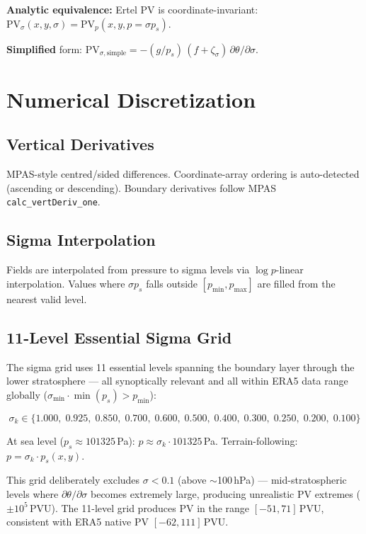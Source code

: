 \documentclass[11pt,a4paper]{article}
\begin{document}
\textbf{Analytic equivalence:} Ertel PV is coordinate-invariant:
$\mathrm{PV}_\sigma(x,y,\sigma) = \mathrm{PV}_p(x,y,p=\sigma p_s)$.

\textbf{Simplified} form: $\mathrm{PV}_{\sigma,\mathrm{simple}} =
  -(g/p_s)\,(f + \zeta_\sigma)\,\partial\theta/\partial\sigma$.

\section{Numerical Discretization}

\subsection{Vertical Derivatives}

MPAS-style centred/sided differences. Coordinate-array ordering is
auto-detected (ascending or descending).  Boundary derivatives follow
MPAS \texttt{calc\_vertDeriv\_one}.

\subsection{Sigma Interpolation}

Fields are interpolated from pressure to sigma levels via $\log p$-linear
interpolation.  Values where $\sigma p_s$ falls outside
$[p_{\min}, p_{\max}]$ are filled from the nearest valid level.

\subsection{11-Level Essential Sigma Grid}

The sigma grid uses 11 essential levels spanning the boundary layer
through the lower stratosphere --- all synoptically relevant and all
within ERA5 data range globally ($\sigma_{\min} \cdot \min(p_s) > p_{\min}$):

\begin{equation}
\sigma_k \in \{1.000,\; 0.925,\; 0.850,\; 0.700,\; 0.600,\; 0.500,\;
               0.400,\; 0.300,\; 0.250,\; 0.200,\; 0.100\}
\end{equation}

At sea level ($p_s \approx 101325$\,Pa): $p \approx \sigma_k \cdot 101325$\,Pa.
Terrain-following: $p = \sigma_k \cdot p_s(x,y)$.

This grid deliberately excludes $\sigma < 0.1$ (above $\sim$100\,hPa) ---
mid-stratospheric levels where $\partial\theta/\partial\sigma$ becomes
extremely large, producing unrealistic PV extremes ($\pm 10^5$\,PVU).
The 11-level grid produces PV in the range $[-51, 71]$\,PVU, consistent
with ERA5 native PV $[-62, 111]$\,PVU.
\end{document}
